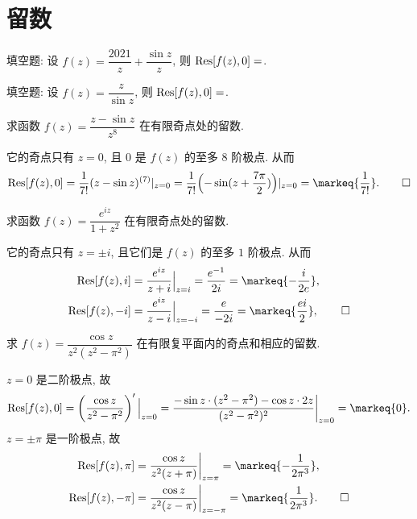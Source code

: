 \section{留数}

\begin{exercise}
	填空题: 设 $f(z)=\dfrac{2021}z+\dfrac{\sin z}z$, 则 ${\mathrm{Res}}[f(z),0]=$.
\end{exercise}


\begin{exercise}
	填空题: 设 $f(z)=\dfrac{z}{\sin z}$, 则 ${\mathrm{Res}}[f(z),0]=$.
\end{exercise}


\begin{exercise}
	求函数 $f(z)=\dfrac{z-\sin z}{z^8}$ 在有限奇点处的留数.  
\end{exercise}
\begin{solution}
	它的奇点只有 $z=0$, 且 $0$ 是 $f(z)$ 的至多 $8$ 阶极点.
	从而
	\[\Res[f(z),0]=\frac1{7!}(z-\sin z)^{(7)}|_{z=0}
		=\frac1{7!}\Bigl(-\sin(z+\frac{7\pi}2)\Bigr)|_{z=0}=\markeq{\frac1{7!}}.\qedhere\]
\end{solution}


\begin{exercise}
	求函数 $f(z)=\dfrac{e^{iz}}{1+z^2}$ 在有限奇点处的留数.
\end{exercise}
\begin{solution}
	它的奇点只有 $z=\pm i$, 且它们是 $f(z)$ 的至多 $1$ 阶极点.
	从而
	\begin{align*}
		\Res[f(z),i]&=\frac{e^{iz}}{z+i}\Big|_{z=i}=\frac{e^{-1}}{2i}=\markeq{-\frac i{2e}},\\
		\Res[f(z),-i]&=\frac{e^{iz}}{z-i}\Big|_{z=-i}=\frac{e}{-2i}=\markeq{\frac {ei}2},\qedhere
	\end{align*}
\end{solution}


\begin{exercise}
	求 $f(z)=\dfrac{\cos z}{z^2(z^2-\pi^2)}$ 在有限复平面内的奇点和相应的留数.
\end{exercise}
\begin{solution}
	$z=0$ 是二阶极点, 故
	\[\Res[f(z),0]=\left(\frac{\cos z}{z^2-\pi^2}\right)'\Big|_{z=0}=\frac{-\sin z\cdot(z^2-\pi^2)-\cos z\cdot 2z}{(z^2-\pi^2)^2}\bigg|_{z=0}=\markeq{0}.\]
	$z=\pm\pi$ 是一阶极点, 故
	\begin{align*}
		\Res[f(z),\pi]&=\frac{\cos z}{z^2(z+\pi)}\bigg|_{z=\pi}=\markeq{-\frac1{2\pi^3}}, \\
		\Res[f(z),-\pi]&=\frac{\cos z}{z^2(z-\pi)}\bigg|_{z=-\pi}=\markeq{\frac1{2\pi^3}}.\qedhere
	\end{align*}	
\end{solution}


